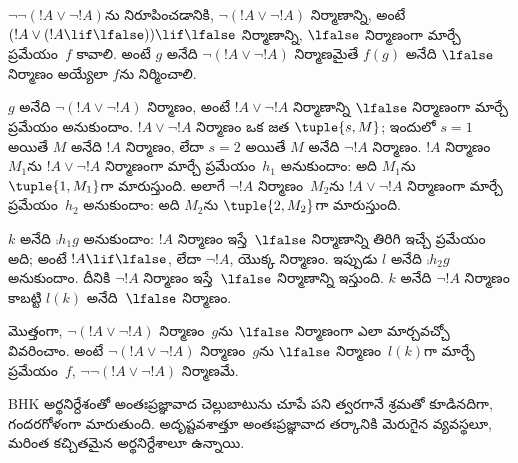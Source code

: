\documentclass[../../../include/open-logic-section]{subfiles}
\begin{document}
\begin{ex}
$\lnot \lnot (!A \lor \lnot !A)$ను నిరూపించడానికి,
$\lnot(!A \lor \lnot !A)$ నిర్మాణాన్ని, అంటే $(!A
\lor (!A \lif \lfalse)) \lif \lfalse$ నిర్మాణాన్ని,
$\lfalse$ నిర్మాణంగా మార్చే ప్రమేయం~$f$ కావాలి.
అంటే $g$ అనేది $\lnot(!A
\lor \lnot !A)$ నిర్మాణమైతే $f(g)$ అనేది
$\lfalse$ నిర్మాణం అయ్యేలా $f$ను నిర్మించాలి.

$g$ అనేది $\lnot(!A \lor \lnot !A)$ నిర్మాణం,
అంటే $!A \lor \lnot !A$ నిర్మాణాన్ని
$\lfalse$ నిర్మాణంగా మార్చే ప్రమేయం అనుకుందాం.
$!A \lor \lnot !A$ నిర్మాణం ఒక జత
$\tuple{s, M}$; ఇందులో $s = 1$ అయితే $M$
అనేది $!A$ నిర్మాణం, లేదా $s = 2$ అయితే
$M$ అనేది $\lnot !A$ నిర్మాణం.
$!A$ నిర్మాణం~$M_1$ను $!A \lor \lnot !A$
నిర్మాణంగా మార్చే ప్రమేయం~$h_1$ అనుకుందాం:
అది $M_1$ను $\tuple{1, M_1}$గా మారుస్తుంది.
అలాగే $\lnot !A$ నిర్మాణం~$M_2$ను
$!A \lor \lnot !A$ నిర్మాణంగా మార్చే
ప్రమేయం~$h_2$ అనుకుందాం: అది $M_2$ను
$\tuple{2, M_2}$గా మారుస్తుంది.

$k$ అనేది $\comp{h_1}{g}$ అనుకుందాం: $!A$
నిర్మాణం ఇస్తే~$\lfalse$ నిర్మాణాన్ని తిరిగి
ఇచ్చే ప్రమేయం అది; అంటే $!A \lif \lfalse$,
లేదా $\lnot !A$, యొక్క నిర్మాణం. ఇప్పుడు
$l$ అనేది $\comp{h_2}{g}$ అనుకుందాం. దీనికి
$\lnot !A$ నిర్మాణం ఇస్తే~$\lfalse$
నిర్మాణాన్ని ఇస్తుంది. $k$ అనేది $\lnot !A$
నిర్మాణం కాబట్టి $l(k)$ అనేది~$\lfalse$
నిర్మాణం.

మొత్తంగా, $\lnot(!A \lor \lnot !A)$ నిర్మాణం~$g$ను
$\lfalse$ నిర్మాణంగా ఎలా మార్చవచ్చో వివరించాం.
అంటే $\lnot(!A \lor \lnot !A)$ నిర్మాణం~$g$ను
$\lfalse$ నిర్మాణం~$l(k)$గా మార్చే ప్రమేయం~$f$,
$\lnot\lnot(!A \lor \lnot !A)$ నిర్మాణమే.
\end{ex}

BHK అర్థనిర్దేశంతో
 అంతఃప్రజ్ఞావాద చెల్లుబాటును
చూపే పని త్వరగానే శ్రమతో కూడినదిగా, గందరగోళంగా
మారుతుంది. అదృష్టవశాత్తూ అంతఃప్రజ్ఞావాద తర్కానికి
మెరుగైన  వ్యవస్థలూ,
మరింత కచ్చితమైన అర్థనిర్దేశాలూ ఉన్నాయి.
\end{document}
